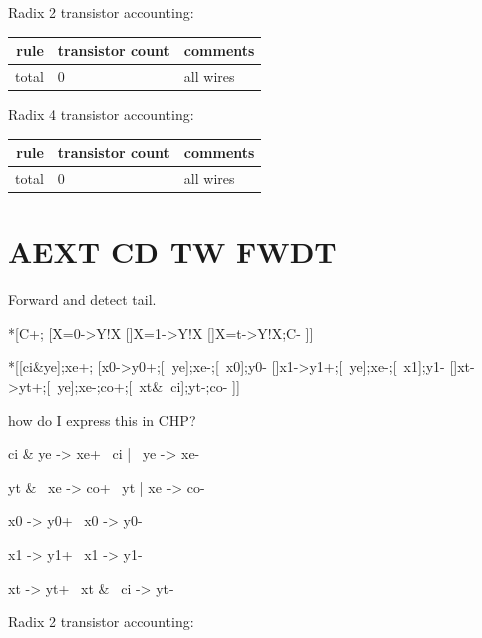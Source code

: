 \documentclass{article}
\begin{document}
\noindent
Radix 2 transistor accounting:

\begin{center}
    \begin{tabular}{|r|l|l|}
    \hline
    rule & transistor count & comments \\ \hline
    \hline total & 0 & all wires\\ \hline
    \end{tabular}
\end{center}

\noindent
Radix 4 transistor accounting:

\begin{center}
    \begin{tabular}{|r|l|l|}
    \hline
    rule & transistor count & comments \\ \hline
    \hline total & 0 & all wires \\ \hline
    \end{tabular}
\end{center}

\section{AEXT CD TW FWDT \label{sec:AEXT_CD_TW_FWDT}}

Forward and detect tail.

\begin{csp}
*[C+;
  [X=0->Y!X
  []X=1->Y!X
  []X=t->Y!X;C-
 ]]
\end{csp}

\begin{hse}
*[[ci&ye];xe+;
  [x0->y0+;[~ye];xe-;[~x0];y0-
  []x1->y1+;[~ye];xe-;[~x1];y1-
  []xt->yt+;[~ye];xe-;co+;[~xt&~ci];yt-;co-
 ]]
\end{hse}

how do I express this in CHP?

\begin{prs2}
ci & ye -> xe+
~ci | ~ye -> xe-

yt & ~xe -> co+
~yt | xe -> co-
\end{prs2}

\begin{prs2}
x0 -> y0+
~x0 -> y0-

x1 -> y1+
~x1 -> y1-

xt -> yt+
~xt & ~ci -> yt-
\end{prs2}

\noindent
Radix 2 transistor accounting:
\end{document}
